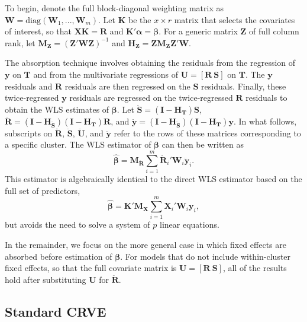 \documentclass[12pt]{article}
\newcommand{\bm}{\mathbf}
\newcommand{\bs}{\boldsymbol}
\begin{document}
To begin, denote the full block-diagonal weighting matrix as $\bm{W} = \text{diag}\left(\bm{W}_1,...,\bm{W}_m\right)$.
Let $\bm{K}$ be the $x \times r$ matrix that selects the covariates of interest, so that $\bm{X} \bm{K} = \bm{R}$ and $\bm{K}'\bs\alpha = \bs\beta$.
For a generic matrix $\bm{Z}$ of full column rank, let $\bm{M_Z} = \left(\bm{Z}'\bm{W}\bm{Z}\right)^{-1}$ and $\bm{H_Z} = \bm{Z}\bm{M_Z}\bm{Z}'\bm{W}$. 

The absorption technique involves obtaining the residuals from the regression of $\bm{y}$ on $\bm{T}$ and from the multivariate regressions of $\bm{U} = [\bm{R}\ \bm{S}]$ on $\bm{T}$. 
The $\bm{y}$ residuals and $\bm{R}$ residuals are then regressed on the $\bm{S}$ residuals. 
Finally, these twice-regressed $\bm{y}$ residuals are regressed on the twice-regressed $\bm{R}$ residuals to obtain the WLS estimates of $\bs\beta$. 
Let $\bm{\ddot{S}} = \left(\bm{I} - \bm{H_T}\right)\bm{S}$, $\bm{\ddot{R}} = \left(\bm{I} - \bm{H_{\ddot{S}}}\right)\left(\bm{I} - \bm{H_T}\right)\bm{R}$, and $\bm{\ddot{y}} = \left(\bm{I} - \bm{H_{\ddot{S}}}\right)\left(\bm{I} - \bm{H_T}\right)\bm{y}$. 
In what follows, subscripts on $\bm{\ddot{R}}$, $\bm{\ddot{S}}$,  $\bm{\ddot{U}}$, and $\bm{\ddot{y}}$ refer to the rows of these matrices corresponding to a specific cluster. 
The WLS estimator of $\bs\beta$ can then be written as
\begin{equation}
\label{eq:WLS}
\bs{\hat\beta} = \bm{M_{\ddot{R}}} \sum_{i=1}^m \bm{\ddot{R}}_i' \bm{W}_i \bm{\ddot{y}}_i. 
\end{equation}
This estimator is algebraically identical to the direct WLS estimator based on the full set of predictors, \[
\bs{\hat\beta} = \bm{K}'\bm{M_X} \sum_{i=1}^m \bm{X}_i' \bm{W}_i \bm{y}_i,
\]
but avoids the need to solve a system of $p$ linear equations.

In the remainder, we focus on the more general case in which fixed effects are absorbed before estimation of $\bs\beta$. For models that do not include within-cluster fixed effects, so that the full covariate matrix is $\bm{U} = \left[\bm{R} \ \bm{S}\right]$, all of the results hold after substituting $\bm{U}$ for $\bm{\ddot{R}}$. 

\subsection{Standard CRVE}
\end{document}
